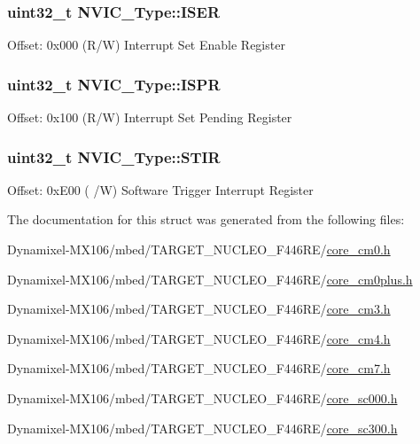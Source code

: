 \subsubsection[{\texorpdfstring{I\+S\+ER}{ISER}}]{ uint32\+\_\+t N\+V\+I\+C\+\_\+\+Type\+::\+I\+S\+ER}\hypertarget{struct_n_v_i_c___type_aaff305f50a7117272e5523ec17cff9ec}{}\label{struct_n_v_i_c___type_aaff305f50a7117272e5523ec17cff9ec}
Offset\+: 0x000 (R/W) Interrupt Set Enable Register 
\subsubsection[{\texorpdfstring{I\+S\+PR}{ISPR}}]{ uint32\+\_\+t N\+V\+I\+C\+\_\+\+Type\+::\+I\+S\+PR}\hypertarget{struct_n_v_i_c___type_aa98673f8401e00b2dc73003a4d747e0b}{}\label{struct_n_v_i_c___type_aa98673f8401e00b2dc73003a4d747e0b}
Offset\+: 0x100 (R/W) Interrupt Set Pending Register 
\subsubsection[{\texorpdfstring{S\+T\+IR}{STIR}}]{ uint32\+\_\+t N\+V\+I\+C\+\_\+\+Type\+::\+S\+T\+IR}\hypertarget{struct_n_v_i_c___type_a0b0d7f3131da89c659a2580249432749}{}\label{struct_n_v_i_c___type_a0b0d7f3131da89c659a2580249432749}
Offset\+: 0x\+E00 ( /W) Software Trigger Interrupt Register 

The documentation for this struct was generated from the following files\+:\begin{DoxyCompactItemize}
\item 
Dynamixel-\/\+M\+X106/mbed/\+T\+A\+R\+G\+E\+T\+\_\+\+N\+U\+C\+L\+E\+O\+\_\+\+F446\+R\+E/\hyperlink{core__cm0_8h}{core\+\_\+cm0.\+h}\item 
Dynamixel-\/\+M\+X106/mbed/\+T\+A\+R\+G\+E\+T\+\_\+\+N\+U\+C\+L\+E\+O\+\_\+\+F446\+R\+E/\hyperlink{core__cm0plus_8h}{core\+\_\+cm0plus.\+h}\item 
Dynamixel-\/\+M\+X106/mbed/\+T\+A\+R\+G\+E\+T\+\_\+\+N\+U\+C\+L\+E\+O\+\_\+\+F446\+R\+E/\hyperlink{core__cm3_8h}{core\+\_\+cm3.\+h}\item 
Dynamixel-\/\+M\+X106/mbed/\+T\+A\+R\+G\+E\+T\+\_\+\+N\+U\+C\+L\+E\+O\+\_\+\+F446\+R\+E/\hyperlink{core__cm4_8h}{core\+\_\+cm4.\+h}\item 
Dynamixel-\/\+M\+X106/mbed/\+T\+A\+R\+G\+E\+T\+\_\+\+N\+U\+C\+L\+E\+O\+\_\+\+F446\+R\+E/\hyperlink{core__cm7_8h}{core\+\_\+cm7.\+h}\item 
Dynamixel-\/\+M\+X106/mbed/\+T\+A\+R\+G\+E\+T\+\_\+\+N\+U\+C\+L\+E\+O\+\_\+\+F446\+R\+E/\hyperlink{core__sc000_8h}{core\+\_\+sc000.\+h}\item 
Dynamixel-\/\+M\+X106/mbed/\+T\+A\+R\+G\+E\+T\+\_\+\+N\+U\+C\+L\+E\+O\+\_\+\+F446\+R\+E/\hyperlink{core__sc300_8h}{core\+\_\+sc300.\+h}\end{DoxyCompactItemize}
